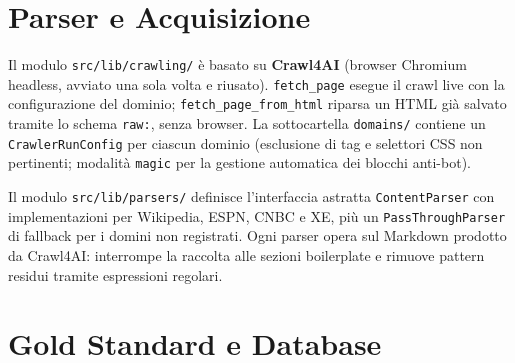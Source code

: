 \documentclass[11pt]{article}
\begin{document}
\section{Parser e Acquisizione}

Il modulo \texttt{src/lib/crawling/} è basato su \textbf{Crawl4AI} (browser Chromium headless, avviato una sola volta e riusato). \texttt{fetch\_page} esegue il crawl live con la configurazione del dominio; \texttt{fetch\_page\_from\_html} riparsa un HTML già salvato tramite lo schema \texttt{raw:}, senza browser. La sottocartella \texttt{domains/} contiene un \texttt{CrawlerRunConfig} per ciascun dominio (esclusione di tag e selettori CSS non pertinenti; modalità \texttt{magic} per la gestione automatica dei blocchi anti-bot).

Il modulo \texttt{src/lib/parsers/} definisce l'interfaccia astratta \texttt{ContentParser} con implementazioni per Wikipedia, ESPN, CNBC e XE, più un \texttt{PassThroughParser} di fallback per i domini non registrati. Ogni parser opera sul Markdown prodotto da Crawl4AI: interrompe la raccolta alle sezioni boilerplate e rimuove pattern residui tramite espressioni regolari.


\section{Gold Standard e Database}
\end{document}
